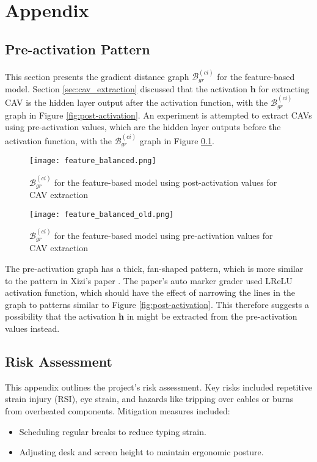 \chapter*{Appendix}
\renewcommand{\thesection}{\Alph{section}}
\section{Pre-activation Pattern} \label{app:feature_bias}

This section presents the gradient distance graph $\mathcal{B}^{(ci)}_{gr}$ for the feature-based model. Section \ref{sec:cav_extraction} discussed that the activation $\boldsymbol{h}$ for extracting CAV is the hidden layer output after the activation function, with the $\mathcal{B}^{(ci)}_{gr}$ graph in Figure \ref{fig:post-activation}. An experiment is attempted to extract CAVs using pre-activation values, which are the hidden layer outputs before the activation function, with the $\mathcal{B}^{(ci)}_{gr}$ graph in Figure \ref{fig:pre-activation}.

\begin{figure}[H]
    \centering
    \begin{minipage}[t]{0.48\textwidth}
        \centering
        \texttt{[image: feature\_balanced.png]}
        \caption{$\mathcal{B}^{(ci)}_{gr}$ for the feature-based model using post-activation values for CAV extraction}
        \label{fig:post-activation}
    \end{minipage}
    \hfill
    \begin{minipage}[t]{0.48\textwidth}
        \centering
        \texttt{[image: feature\_balanced\_old.png]}
        \caption{$\mathcal{B}^{(ci)}_{gr}$ for the feature-based model using pre-activation values for CAV extraction}
        \label{fig:pre-activation}
    \end{minipage}
\end{figure}

The pre-activation graph has a thick, fan-shaped pattern, which is more similar to the pattern in Xizi's paper \cite{feature_bias}. The paper's auto marker grader used LReLU activation function, which should have the effect of narrowing the lines in the graph to patterns similar to Figure \ref{fig:post-activation}. This therefore suggests a possibility that the activation $\boldsymbol{h}$ in \cite{feature_bias} might be extracted from the pre-activation values instead.

\section{Risk Assessment}
This appendix outlines the project's risk assessment. Key risks included repetitive strain injury (RSI), eye strain, and hazards like tripping over cables or burns from overheated components. Mitigation measures included:

\begin{itemize}
    \item Scheduling regular breaks to reduce typing strain.
    \item Adjusting desk and screen height to maintain ergonomic posture.
\end{itemize}
